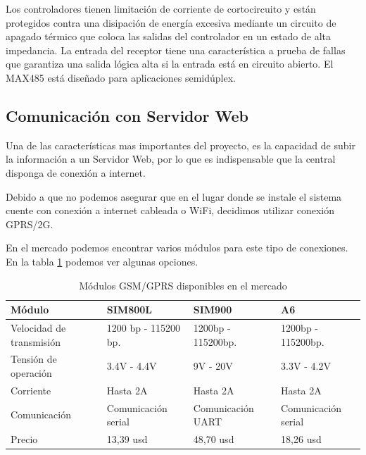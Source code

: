 Los controladores tienen limitación de corriente de cortocircuito y están protegidos
contra una disipación de energía excesiva mediante un circuito de apagado térmico que coloca las salidas del controlador en un estado de alta 
impedancia. La entrada del receptor tiene una característica a prueba de fallas que garantiza una salida lógica alta si la entrada está en 
circuito abierto. El MAX485 está diseñado para aplicaciones semidúplex.


\subsection{Comunicación con Servidor Web}

Una de las características mas importantes del proyecto, es la capacidad de subir la información a un Servidor Web, por lo que es indispensable que la central disponga
de conexión a internet.\par
Debido a que no podemos asegurar que en el lugar donde se instale el sistema cuente con conexión a internet cableada o WiFi, decidimos utilizar conexión GPRS/2G. \par
En el mercado podemos encontrar varios módulos para este tipo de conexiones. En la tabla \ref{tab:gsm} podemos ver algunas opciones.

\begin{table}[t]
    \begin{center}
        \begin{tabular}{ | m{3cm} | m{3cm} | m{3cm} | m{3cm} | }
        \hline Módulo & SIM800L & SIM900 & A6  \\ \hline
        Velocidad de transmisión & 1200 bp - 115200 bp. & 1200bp - 115200bp. & 1200bp - 115200bp. \\ \hline
        Tensión de operación & 3.4V - 4.4V & 9V - 20V & 3.3V - 4.2V \\ \hline
        Corriente & Hasta 2A & Hasta 2A & Hasta 2A\\ \hline
        Comunicación & Comunicación serial & Comunicación UART & Comunicación serial\\ \hline
        Precio & 13,39 usd &  48,70 usd & 18,26 usd\\ \hline
        
        \end{tabular}
        \caption{Módulos GSM/GPRS disponibles en el mercado}
        \label{tab:gsm}   
    \end{center}
\end{table}

